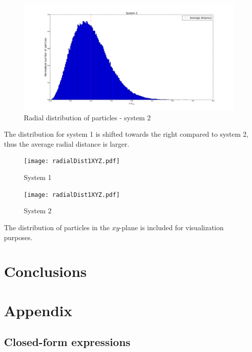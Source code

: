 \documentclass[english, a4paper]{article}
\begin{document}
\begin{figure}[H]
\begin{center}
  \includegraphics[width = 200mm]{radialDistSystem2.pdf}
  \caption{Radial distribution of particles - system 2}\label{fig:density2}
  \end{center}
\end{figure}
The distribution for system 1 is shifted towards the right compared to system 2, thus
the average radial distance is larger. 

\begin{figure}
\begin{minipage}[t]{0.48\linewidth}
  \texttt{[image: radialDist1XYZ.pdf]}
  \caption{System 1}
  \label{fig:density3}
\end{minipage}
\quad
\begin{minipage}[t]{0.48\linewidth}
\texttt{[image: radialDist1XYZ.pdf]}
  \caption{System 2}
  \label{fig:density4}
\end{minipage}
\end{figure}
The distribution of particles in the $xy$-plane is included for visualization purposes. 








\section{Conclusions}






\section{Appendix}

\subsection{Closed-form expressions}
\end{document}
